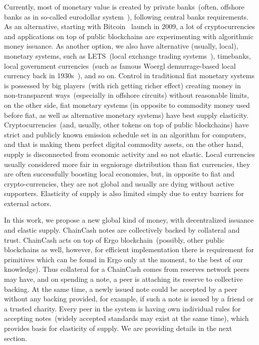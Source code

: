 \documentclass{article}   %
\newcommand{\cc}{ChainCash}
\begin{document}
Currently, most of monetary value is created by private banks~(often, offshore banks as in so-called eurodollar
system~\cite{machlup1970euro}), following central banks requirements. As an alternative, starting with
Bitcoin~\cite{nakamoto2008peer} launch in 2009, a lot of cryptocurrencies and applications on top of public
blockchains are experimenting with algorithmic money issuance. As another option, we also have alternative (usually, local),
monetary systems, such as LETS~(local exchange trading systems~\cite{williams1996new}), timebanks, local government
currencies~(such as famous Woergl demurrage-based local currency back in 1930s~\cite{unterguggenbercer1934end}), and so on.
Control in traditional fiat monetary systems is possessed by big players~(with rich getting richer effect) creating
money in non-transparent ways~(especially in offshore circuits) without reasonable limits, on the other side,
fiat monetary systems (in opposite to commodity money used before fiat, as well as alternative monetary systems) have
best supply elasticity. Cryptocurrencies~(and, usually, other tokens on top of public blockchains) have strict and
publicly known emission schedule set in an algorithm for computers, and that is making them perfect digital commodity assets,
on the other hand, supply is disconnected from economic activity and so not elastic. Local currencies usually considered
more fair in segniorage distribution than fiat currencies, they are often successfully boosting local economies, but,
in opposite to fiat and crypto-currencies, they are not global and usually are dying without active supporters.
Elasticity of supply is also limited simply due to entry barriers for external actors.

In this work, we propose a new global kind of money, with decentralized issuance and elastic supply. \cc{} notes are
collectively backed by collateral and trust. \cc{} acts on top of Ergo blockchain~(possibly, other public blockchains
as well, however, for efficient implementation there is requirement for primitives which can be found in Ergo only at the moment, to the best of our knowledge). Thus collateral for a \cc{} comes from reserves network peers may have, and on spending a note, a peer is attaching its
reserve to collective backing. At the same time, a newly issued note could be accepted by a peer without any backing provided, for example, if such a note is issued by a friend or a trusted charity. Every peer in the system is having own individual rules
for accepting notes~(widely accepted standards may exist at the same time), which provides basis for elasticity of supply. We are providing details in the next section.
\end{document}
